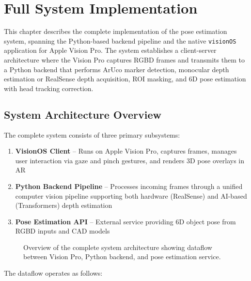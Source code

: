 \section{Full System Implementation}

This chapter describes the complete implementation of the pose estimation system, spanning the Python-based backend pipeline and the native \texttt{visionOS} application for Apple Vision Pro. The system establishes a client-server architecture where the Vision Pro captures RGBD frames and transmits them to a Python backend that performs ArUco marker detection, monocular depth estimation or RealSense depth acquisition, ROI masking, and 6D pose estimation with head tracking correction.

\subsection{System Architecture Overview}

The complete system consists of three primary subsystems:

\begin{enumerate}
    \item \textbf{VisionOS Client} -- Runs on Apple Vision Pro, captures frames, manages user interaction via gaze and pinch gestures, and renders 3D pose overlays in AR
    \item \textbf{Python Backend Pipeline} -- Processes incoming frames through a unified computer vision pipeline supporting both hardware (RealSense) and AI-based (Transformers) depth estimation
    \item \textbf{Pose Estimation API} -- External service providing 6D object pose from RGBD inputs and CAD models
\end{enumerate}

\begin{figure}[H]
    \centering
    \caption{Overview of the complete system architecture showing dataflow between Vision Pro, Python backend, and pose estimation service.}
    \label{fig:system_arch}
\end{figure}

The dataflow operates as follows:


